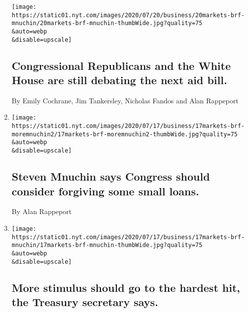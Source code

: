 \begin{enumerate}
  \texttt{[image: https://static01.nyt.com/images/2020/07/20/business/20markets-brf-mnuchin/20markets-brf-mnuchin-thumbWide.jpg?quality=75\\\&auto=webp\\\&disable=upscale]}

  \hypertarget{congressional-republicans-and-the-white-house-are-still-debating-the-next-aid-bill}{%
  \subsection{Congressional Republicans and the White House are still
  debating the next aid
  bill.}\label{congressional-republicans-and-the-white-house-are-still-debating-the-next-aid-bill}}

  By Emily Cochrane, Jim Tankersley, Nicholas Fandos and Alan Rappeport
\item
  \href{/live/2020/07/17/business/stock-market-today-coronavirus/steven-mnuchin-says-congress-should-consider-forgiving-some-small-loans}{}

  \texttt{[image: https://static01.nyt.com/images/2020/07/17/business/17markets-brf-moremnuchin2/17markets-brf-moremnuchin2-thumbWide.jpg?quality=75\\\&auto=webp\\\&disable=upscale]}

  \hypertarget{steven-mnuchin-says-congress-should-consider-forgiving-some-small-loans}{%
  \subsection{Steven Mnuchin says Congress should consider forgiving
  some small
  loans.}\label{steven-mnuchin-says-congress-should-consider-forgiving-some-small-loans}}

  By Alan Rappeport
\item
  \href{/live/2020/07/17/business/stock-market-today-coronavirus/more-stimulus-should-go-to-the-hardest-hit-the-treasury-secretary-says}{}

  \texttt{[image: https://static01.nyt.com/images/2020/07/17/business/17markets-brf-mnuchin/17markets-brf-mnuchin-thumbWide.jpg?quality=75\\\&auto=webp\\\&disable=upscale]}

  \hypertarget{more-stimulus-should-go-to-the-hardest-hit-the-treasury-secretary-says}{%
  \subsection{More stimulus should go to the hardest hit, the Treasury
  secretary
  says.}\label{more-stimulus-should-go-to-the-hardest-hit-the-treasury-secretary-says}}


\end{enumerate}
